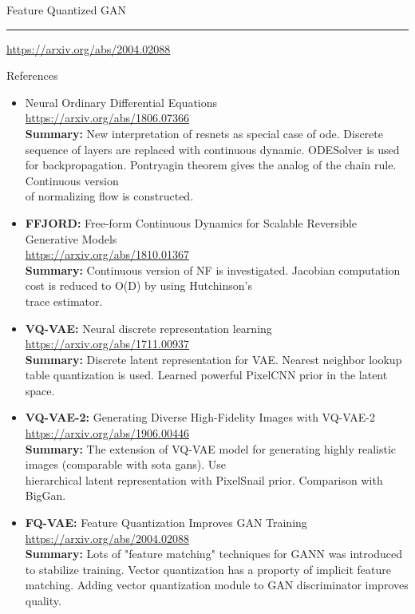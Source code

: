 \begin{frame}{Feature Quantized GAN}
	\hrule\medskip
	{\scriptsize \href{https://arxiv.org/abs/2004.02088}{https://arxiv.org/abs/2004.02088}} 
\end{frame}
\begin{frame}{References}
{\tiny
\begin{itemize}
    \item Neural Ordinary Differential Equations \\
    \href{https://arxiv.org/abs/1806.07366}{https://arxiv.org/abs/1806.07366} \\
    \textbf{Summary:} New interpretation of resnets as special case of ode. 
    Discrete sequence of layers  are replaced with continuous dynamic. ODESolver is used for backpropagation. Pontryagin theorem gives the analog of the chain rule. Continuous version \\ of normalizing flow is constructed.
    
    \item \textbf{FFJORD:} Free-form Continuous Dynamics for Scalable Reversible Generative Models \\
    \href{https://arxiv.org/abs/1810.01367}{https://arxiv.org/abs/1810.01367} \\
    \textbf{Summary:} Continuous version of NF is investigated. 
    Jacobian computation cost is reduced to O(D) by using Hutchinson’s \\ trace estimator. 
    
    \item \textbf{VQ-VAE:} Neural discrete representation learning \\
    \href{https://arxiv.org/abs/1711.00937}{https://arxiv.org/abs/1711.00937} \\
    \textbf{Summary:} Discrete latent representation for VAE. Nearest neighbor lookup table quantization is used. Learned powerful PixelCNN prior in the latent space.
    
    \item \textbf{VQ-VAE-2:} Generating Diverse High-Fidelity Images with VQ-VAE-2 \\
    \href{https://arxiv.org/abs/1906.00446}{https://arxiv.org/abs/1906.00446} \\
    \textbf{Summary:} The extension of VQ-VAE model for generating highly realistic images (comparable with sota gans). Use \\ hierarchical latent representation with PixelSnail prior. Comparison with BigGan.
    
    \item \textbf{FQ-VAE:} Feature Quantization Improves GAN Training \\
    \href{https://arxiv.org/abs/2004.02088}{https://arxiv.org/abs/2004.02088} \\
    \textbf{Summary:} Lots of "feature matching" techniques for GANN was introduced to stabilize training. Vector quantization has a proporty of implicit feature matching. Adding vector quantization module to GAN discriminator improves quality.
\end{itemize}
}
\end{frame}
 